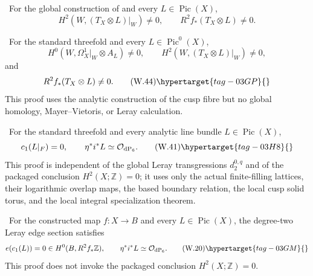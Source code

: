 
\begin{corollary}
\hypertarget{tag-03DR}{}\label{wbII:cor:candidate-conductor-actual}


\ For the global construction of
 and every
$L\in\operatorname{Pic}(X)$,
\[
H^2(W,(T_X\otimes L)|_W)\ne0,
\qquad R^2f_*(T_X\otimes L)\ne0.
\]
\end{corollary}

\begin{corollary}
\hypertarget{tag-03DS}{}\label{wbII:cor:candidate-pic0-route}


\ For the standard threefold and every
$L\in\operatorname{Pic}^0(X)$,
\[
 H^0(W,\Omega_X^1|_W\otimes A_L)\ne0,
 \qquad
 H^2(W,(T_X\otimes L)|_W)\ne0,
\]
and
\[
 R^2f_*(T_X\otimes L)\ne0.
\tag{W.44}\hypertarget{tag-03GP}{}\label{wbII:eq:W:5.17f}
\]
This proof uses the analytic construction of the cusp fibre but no global
homology, Mayer--Vietoris, or Leray calculation.
\end{corollary}

\begin{proposition}
\hypertarget{tag-03IL}{}\label{wbII:prop:direct-boundary-picard}


\ For the standard threefold and every analytic line bundle
$L\in\operatorname{Pic}(X)$,
\[
 c_1(L|_F)=0,
 \qquad
 \eta^*i^*L\simeq\mathcal O_{\mathrm{dP}_6}.
\tag{W.41}\hypertarget{tag-03H8}{}\label{wbII:eq:W:5.17q}
\]
This proof is independent of the global Leray transgressions
$d_2^{0,q}$ and of the packaged conclusion $H^2(X;\mathbb Z)=0$; it uses
only the actual finite-filling lattices, their logarithmic overlap maps, the
based boundary relation, the local cusp solid torus, and the local integral
specialization theorem.
\end{proposition}

\begin{proposition}
\hypertarget{tag-03IM}{}\label{wbII:prop:leray-edge-restriction}


\ For the constructed map $f:X\to B$ and every
$L\in\operatorname{Pic}(X)$, the degree-two Leray edge section satisfies
\[
 e(c_1(L))=0\in H^0(B,R^2f_*\mathbb Z),
 \qquad
 \eta^*i^*L\simeq\mathcal O_{\mathrm{dP}_6}.
\tag{W.20}\hypertarget{tag-03GM}{}\label{wbII:eq:W:5.17c}
\]
This proof does not invoke the packaged conclusion
$H^2(X;\mathbb Z)=0$.
\end{proposition}

